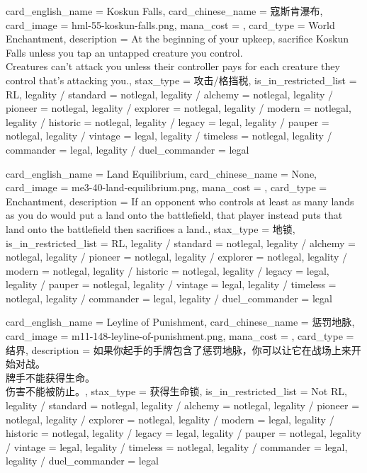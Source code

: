 \documentclass[lang = cn, color = black, 10pt]{AllThatStax}
\begin{document}
\card
{
	card_english_name = {Koskun Falls},
	card_chinese_name = {寇斯肯瀑布},
	card_image = hml-55-koskun-falls.png,
	mana_cost = ,
	card_type = World Enchantment,
	description = {At the beginning of your upkeep, sacrifice Koskun Falls unless you tap an untapped creature you control.\\
		Creatures can't attack you unless their controller pays  for each creature they control that's attacking you.},
	stax_type = 攻击/格挡税,
	is_in_restricted_list = RL,
	legality / standard = notlegal,
	legality / alchemy = notlegal,
	legality / pioneer = notlegal,
	legality / explorer = notlegal,
	legality / modern = notlegal,
	legality / historic = notlegal,
	legality / legacy = legal,
	legality / pauper = notlegal,
	legality / vintage = legal,
	legality / timeless = notlegal,
	legality / commander = legal,
	legality / duel_commander = legal
}

\card
{
	card_english_name = {Land Equilibrium},
	card_chinese_name = {None},
	card_image = me3-40-land-equilibrium.png,
	mana_cost = ,
	card_type = Enchantment,
	description = {If an opponent who controls at least as many lands as you do would put a land onto the battlefield, that player instead puts that land onto the battlefield then sacrifices a land.},
	stax_type = 地锁,
	is_in_restricted_list = RL,
	legality / standard = notlegal,
	legality / alchemy = notlegal,
	legality / pioneer = notlegal,
	legality / explorer = notlegal,
	legality / modern = notlegal,
	legality / historic = notlegal,
	legality / legacy = legal,
	legality / pauper = notlegal,
	legality / vintage = legal,
	legality / timeless = notlegal,
	legality / commander = legal,
	legality / duel_commander = legal
}

\card
{
	card_english_name = {Leyline of Punishment},
	card_chinese_name = {惩罚地脉},
	card_image = m11-148-leyline-of-punishment.png,
	mana_cost = ,
	card_type = 结界,
	description = {如果你起手的手牌包含了惩罚地脉，你可以让它在战场上来开始对战。\\
		牌手不能获得生命。\\
		伤害不能被防止。},
	stax_type = 获得生命锁,
	is_in_restricted_list = Not RL,
	legality / standard = notlegal,
	legality / alchemy = notlegal,
	legality / pioneer = notlegal,
	legality / explorer = notlegal,
	legality / modern = legal,
	legality / historic = notlegal,
	legality / legacy = legal,
	legality / pauper = notlegal,
	legality / vintage = legal,
	legality / timeless = notlegal,
	legality / commander = legal,
	legality / duel_commander = legal
}
\end{document}
